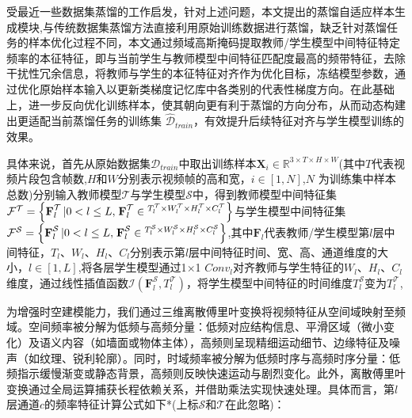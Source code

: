 \documentclass[10.5pt,letterpaper]{article}
\begin{document}
受最近一些数据集蒸馏的工作\cite{lei-tpami2024-survey}\cite{lee-icml2022-dataset}\cite{liu-nips2022-dataset}启发，针对上述问题，本文提出的蒸馏自适应样本生成模块,与传统数据集蒸馏方法直接利用原始训练数据进行蒸馏，缺乏针对蒸馏任务的样本优化过程不同，本文通过频域高斯掩码提取教师/学生模型中间特征特定频率的本征特征，即与当前学生与教师模型中间特征匹配度最高的频带特征，去除干扰性冗余信息，将教师与学生的本征特征对齐作为优化目标，冻结模型参数，通过优化原始样本输入以更新类梯度记忆库中各类别的代表性梯度方向。在此基础上，进一步反向优化训练样本，使其朝向更有利于蒸馏的方向分布，从而动态构建出更适配当前蒸馏任务的训练集 $\hat{\mathcal{D}}_{train}$，有效提升后续特征对齐与学生模型训练的效果。


具体来说，首先从原始数据集$\mathcal{D}_{train}$中取出训练样本$\textbf{X}_i \in \mathbb{R}^{3 \times T \times H \times W}$(其中$T$代表视频片段包含帧数,$H$和$W$分别表示视频帧的高和宽，$i\in [1,N]$,$N$ 为训练集中样本总数)分别输入教师模型$\mathcal{T}$与学生模型$\mathcal{S}$中，得到教师模型中间特征集${{\cal F}^\mathcal{T}} = \left\{ {{\textbf{F}}_{l}^\mathcal{T}\left| {0 < l \le L,} \right.{\textbf{F}}_l^\mathcal{T} \in {^{T_l^\mathcal{T} \times W_l^\mathcal{T} \times H_l^\mathcal{T}\times C_l^\mathcal{T}}}} \right\}$与学生模型中间特征集${{\cal F}^\mathcal{S}} = \left\{ {{\textbf{F}}_{l}^\mathcal{S}\left| {0 < l \le L,} \right.{\textbf{F}}_l^\mathcal{S} \in {^{T_l^\mathcal{S} \times W_l^\mathcal{S} \times H_l^\mathcal{S}\times C_l^\mathcal{S}}}} \right\}$,其中$\textbf{F}_{l}$代表教师/学生模型第$l$层中间特征，$T_l$、$W_l$、$H_l$、$C_l$分别表示第$l$层中间特征时间、宽、高、通道维度的大小，$l\in [1,L]$,将各层学生模型通过1$\times$1 $Conv_l$对齐教师与学生特征的$W_l$、$H_l$、$C_l$维度，通过线性插值函数$\mathcal{I}(\textbf{F}_l^\mathcal{S},T_l^\mathcal{T})$，将学生模型中间特征的时间维度$T_l^\mathcal{S} $变为$T_l^\mathcal{T}$,


为增强时空建模能力，我们通过三维离散傅里叶变换将视频特征从空间域映射至频域。空间频率被分解为低频与高频分量：低频对应结构信息、平滑区域（微小变化）及语义内容（如墙面或物体主体），高频则呈现精细运动细节、边缘特征及噪声（如纹理、锐利轮廓）。同时，时域频率被分解为低频时序与高频时序分量：低频指示缓慢渐变或静态背景，高频则反映快速运动与剧烈变化。此外，离散傅里叶变换通过全局运算捕获长程依赖关系，并借助乘法实现快速处理。具体而言，第$l$层通道$c$的频率特征计算公式如下*(上标$\mathcal{S}$和$\mathcal{T}$在此忽略)：
\end{document}
